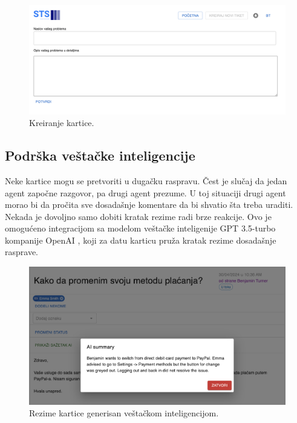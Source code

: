 \documentclass[12pt,oneside]{memoir}
\begin{document}
\begin{figure}[h]
  \centering
  \includegraphics[width=1\textwidth]{docs/images/ch_1/ticket-new.png} 
  \caption{Kreiranje kartice.}
\end{figure}

\newpage
\subsection{Podrška veštačke inteligencije}

Neke kartice mogu se pretvoriti u dugačku raspravu. Čest je slučaj da jedan agent započne razgovor, pa drugi agent prezume. U toj situaciji drugi agent morao bi da pročita sve dosadašnje komentare da bi shvatio šta treba uraditi. Nekada je dovoljno samo dobiti kratak rezime radi brze reakcije. Ovo je omogućeno integracijom sa modelom veštačke inteligenije GPT 3.5-turbo kompanije OpenAI \cite{openai_gpt35turbo}, koji za datu karticu pruža kratak rezime dosadašnje rasprave.

\begin{figure}[h]
  \centering
  \includegraphics[width=1\textwidth]{docs/images/ch_1/ai-summary.png} 
  \caption{Rezime kartice generisan veštačkom inteligencijom.}
\end{figure}
\end{document}
